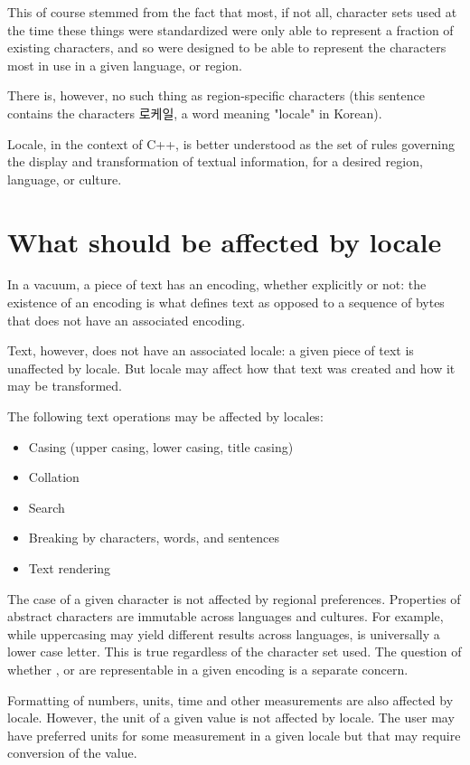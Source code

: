 \documentclass{wg21}
\newcommand{\UnicodeLetter}[1]{\textbf{\textcolor{BrickRed}{\Large\tcode{#1}}}}
\begin{document}
This of course stemmed from the fact that most, if not all, character sets used at the time these things were standardized were only able to represent a fraction of existing characters, and so were designed to be able to represent the characters most in use in a given language, or region.

There is, however, no such thing as region-specific characters (this sentence contains the characters 로케일, a word meaning "locale" in Korean).

Locale, in the context of C++, is better understood as the set of rules governing the display and transformation of textual information, for a desired region, language, or culture.

\section{What should be affected by locale}

In a vacuum, a piece of text has an encoding, whether explicitly or not: the existence of an encoding is what defines text as opposed to a sequence of bytes that does not have an associated encoding.

Text, however, does not have an associated locale: a given piece of text is unaffected by locale.
But locale may affect how that text was created and how it may be transformed.

The following text operations may be affected by locales:
\begin{itemize}
    \item Casing (upper casing, lower casing, title casing)
    \item Collation
    \item Search
    \item Breaking by characters, words, and sentences
    \item Text rendering
\end{itemize}

The case of a given character is not affected by regional preferences. Properties of abstract characters are immutable across languages and cultures. For example, while uppercasing \UnicodeLetter{ss} may yield different results across languages, \UnicodeLetter{s} is universally a lower case letter. This is true regardless of the character set used.
The question of whether \UnicodeLetter{s}, \UnicodeLetter{S} or \UnicodeLetter{ß} are representable in a given encoding is a separate concern.

Formatting of numbers, units, time and other measurements are also affected by locale.
However, the unit of a given value is not affected by locale.
The user may have preferred units for some measurement in a given locale but that may require conversion of the value.
\end{document}
